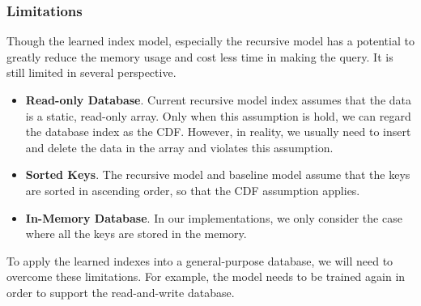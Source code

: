 
\subsubsection{Limitations}

Though the learned index model, especially the recursive model has a potential to greatly reduce the memory usage and cost less time in making the query. It is still limited in several perspective.

\begin{itemize}
    \item \textbf{Read-only Database}. Current recursive model index assumes that the data is a static, read-only array. Only when this assumption is hold, we can regard the database index as the CDF. However, in reality, we usually need to insert and delete the data in the array and violates this assumption.
    \item \textbf{Sorted Keys}. The recursive model and baseline model assume that the keys are sorted in ascending order, so that the CDF assumption applies.
    \item \textbf{In-Memory Database}. In our implementations, we only consider the case where all the keys are stored in the memory. 
\end{itemize}

To apply the learned indexes into a general-purpose database, we will need to overcome these limitations. For example, the model needs to be trained again in order to support the read-and-write database. 